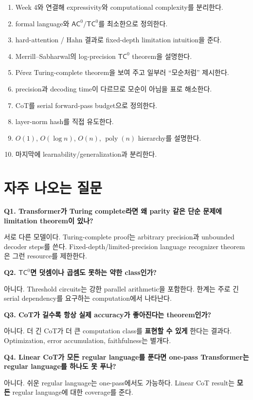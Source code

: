 \documentclass[11pt,a4paper,oneside,openany]{memoir}
\theoremstyle{definition}
\newcommand{\poly}{\operatorname{poly}}
\newcommand{\AC}{\mathsf{AC}}
\newcommand{\TC}{\mathsf{TC}}
\begin{document}
\begin{enumerate}
  \item Week 4와 연결해 expressivity와 computational complexity를 분리한다.
  \item formal language와 $\AC^0/\TC^0$를 최소한으로 정의한다.
  \item hard-attention / Hahn 결과로 fixed-depth limitation intuition을 준다.
  \item Merrill--Sabharwal의 log-precision $\TC^0$ theorem을 설명한다.
  \item Pérez Turing-complete theorem을 보여 주고 일부러 ``모순처럼'' 제시한다.
  \item precision과 decoding time이 다르므로 모순이 아님을 표로 해소한다.
  \item CoT를 serial forward-pass budget으로 정의한다.
  \item layer-norm hash를 직접 유도한다.
  \item $O(1)$, $O(\log n)$, $O(n)$, $\poly(n)$ hierarchy를 설명한다.
  \item 마지막에 learnability/generalization과 분리한다.
\end{enumerate}

\section{자주 나오는 질문}

\textbf{Q1. Transformer가 Turing complete라면 왜 parity 같은 단순 문제에 limitation theorem이 있나?}

서로 다른 모델이다. Turing-complete proof는 arbitrary precision과 unbounded decoder steps를 쓴다. Fixed-depth/limited-precision language recognizer theorem은 그런 resource를 제한한다.

\textbf{Q2. $\TC^0$면 덧셈이나 곱셈도 못하는 약한 class인가?}

아니다. Threshold circuits는 강한 parallel arithmetic을 포함한다. 한계는 주로 긴 serial dependency를 요구하는 computation에서 나타난다.

\textbf{Q3. CoT가 길수록 항상 실제 accuracy가 좋아진다는 theorem인가?}

아니다. 더 긴 CoT가 더 큰 computation class를 \textbf{표현할 수 있게} 한다는 결과다. Optimization, error accumulation, faithfulness는 별개다.

\textbf{Q4. Linear CoT가 모든 regular language를 푼다면 one-pass Transformer는 regular language를 하나도 못 푸나?}

아니다. 쉬운 regular language는 one-pass에서도 가능하다. Linear CoT result는 \textbf{모든} regular language에 대한 coverage를 준다.
\end{document}
